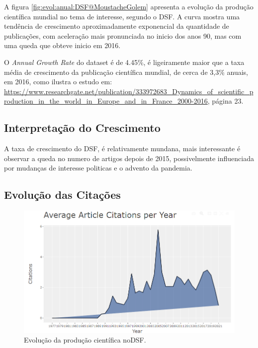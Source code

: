 A figura \ref{fig:evol:anual:DSF@MoustacheGolem} apresenta a evolução da produção científica mundial no tema de interesse, segundo o DSF. A curva mostra uma tendência de crescimento aproximadamente exponencial da quantidade de publicações, com aceleração mais pronunciada no inicio dos anos 90, mas com uma queda que obteve inicio em 2016.

O \textit{Annual Growth Rate} do dataset   é de 4.45\%, é ligeiramente  maior que \newline a taxa média de crescimento da publicação científica mundial, de cerca de 3,3\% anuais, em 2016, como ilustra o estudo em: \newline \url{https://www.researchgate.net/publication/333972683_Dynamics_of_scientific_production_in_the_world_in_Europe_and_in_France_2000-2016}, página 23.
\newpage
\subsection{Interpretação do Crescimento} A taxa de crescimento do DSF, é relativamente mundana, mais interessante é observar a queda no numero de artigos depois de 2015, possivelmente influenciada por mudanças de interesse politicas e o advento da pandemia.


\subsection{Evolução das Citações}

\begin{figure}
    \centering
    \includegraphics[width=1\textwidth]{experiments/MoustacheGolem/T1/img2AvarageArticleCitationsPerYear.PNG}%
    \caption{Evolução da produção científica noDSF.}
    \label{fig:evol:citacoes:DSF@MoustacheGolem}
\end{figure}


